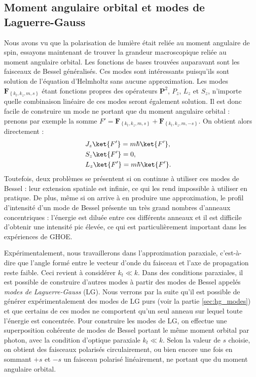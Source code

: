 \subsection{Moment angulaire orbital et modes de Laguerre-Gauss}
Nous avons vu que la polarisation de lumière était reliée au moment angulaire de spin, essayons maintenant de trouver la grandeur macroscopique reliée au moment angulaire orbital. 
Les fonctions de bases trouvées auparavant sont les faisceaux de Bessel généralisés. Ces modes sont intéressants puisqu'ils sont solution de l'équation d'Helmholtz sans aucune approximation. Les modes $\bm{F}_{\left\{k_t,k_z,m,s\right\}}$ étant fonctions propres des opérateurs $\bm{P}^2$, $P_z$, $L_z$ et $S_z$, n'importe quelle combinaison linéaire de ces modes seront également solution. Il est donc facile de construire un mode ne portant que du moment angulaire orbital : prenons par exemple la somme $F'=\bm{F}_{\left\{k_t,k_z,m,s\right\}}+\bm{F}_{\left\{k_t,k_z,m,-s\right\}}$. On obtient alors directement :
\begin{align*}
&J_z\ket{F'} = m\hbar\ket{F'},\\
&S_z\ket{F'} = 0,\\
&L_z\ket{F'} = m\hbar\ket{F'}.
\end{align*}
Toutefois, deux problèmes se présentent si on continue à utiliser ces modes de Bessel : leur extension spatiale est infinie, ce qui les rend impossible à utiliser en pratique. De plus, même si on arrive à en produire une approximation, le profil d'intensité d'un mode de Bessel présente un très grand nombres d'anneaux concentriques : l'énergie est diluée entre ces différents anneaux et il est difficile d'obtenir une intensité pic élevée, ce qui est particulièrement important dans les expériences de GHOE.\par Expérimentalement, nous travaillerons dans l'approximation paraxiale, c'est-à-dire que l'angle formé entre le vecteur d'onde du faisceau et l'axe de propagation reste faible. Ceci revient à considérer $k_t \ll k$. Dans des conditions paraxiales, il est possible de construire d'autres modes à partir des modes de Bessel appelés \textit{modes de Laguerre-Gauss} (LG). Nous verrons par la suite qu'il est possible de générer expérimentalement des modes de LG purs (voir la partie \ref{sec:hg_modes}) et que certains de ces modes ne comportent qu'un seul anneau sur lequel toute l'énergie est concentrée.
Pour construire les modes de LG, on effectue une superposition cohérente de modes de Bessel portant le même moment orbital par photon, avec la condition d'optique paraxiale $k_t \ll k$. Selon la valeur de $s$ choisie, on obtient des faisceaux polarisés circulairement, ou bien encore une fois en sommant $+s$ et $-s$ un faisceau polarisé linéairement, ne portant que du moment angulaire orbital.


